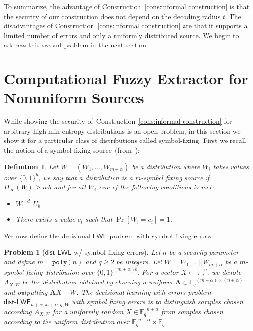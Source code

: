 \documentclass[11pt]{article}
\newcommand{\consref}[1]{\mbox{Construction~\ref{#1}}}
\newcommand{\class}[1]{{\ensuremath{\mathsf{#1}}}}
\newcommand{\vect}[1]{\ensuremath{\textbf{#1}}}
\newcommand{\Fq}{\ensuremath{\mathbb{F}_q}}
\newcommand{\poly}{\ensuremath{\mathtt{poly}}\xspace}
\newcommand{\LWE}{\class{LWE}}
\newcommand{\distLWE}{\ensuremath{\class{dist\mbox{-}LWE}}}
\newtheorem{definition}[theorem]{Definition}
\newtheorem{assumption}[theorem]{Assumption}
\newtheorem{problem}[theorem]{Problem}
\newcommand{\vA}{\vect{A}}
\newcommand{\ignore}[1]{}
\begin{document}
To summarize, the advantage of \consref{cons:informal construction} is that the security of our construction does not depend on the decoding radius $t$.  
The disadvantages of \consref{cons:informal construction} are that it supports a limited number of errors and only a uniformly distributed source.  We begin to address this second problem in the next section.

\section{Computational Fuzzy Extractor for Nonuniform Sources}
\label{sec:LWE block fixing sources}
While showing the security of~\consref{cons:informal construction} for arbitrary high-min-entropy distributions is an open problem, in this section we show it for a particular class of distributions called symbol-fixing.  First we recall the notion of a symbol fixing source~(from~\cite{KZ07}): 
\begin{definition}
Let $W = (W_1,..., W_{m+\alpha})$ be a distribution where $W_i$ takes values over $\{0,1\}^b$, we say that a distribution is a $m$-\emph{symbol fixing source} if $H_\infty(W)\geq mb$ and for all $W_i$ one of the following conditions is met:
\begin{itemize}
\item $W_i \overset{d}= U_b$
\item There exists a value $c_i$ such that $\Pr[W_i = c_i] =1$.
\end{itemize}
\end{definition}

\ignore{
We now study \consref{cons:informal construction} with a symbol fixing source.  

\begin{assumption}[LWE w/ entropic errors]
Let $n$ be a security parameter and define $m = \poly(n)$ and $q\geq 2$ be integers.  Let $W = W_1||...||W_{m+\alpha}$ be a $m$-block fixing distribution over $\{0,1\}^{(m+\alpha)\ell}$. For a vector 
Let $A\in\Fq^{(m+\alpha)\times (n+\alpha)}$ and let $x\in\Fq^{n+\alpha}$.  No PPT algorithm given $Ax+W$ can recover $x$ with probability greater than nonnegligible.
\end{assumption}
}
We now define the decisional $\LWE$ problem with symbol fixing errors: 
\begin{problem}[$\distLWE$ w/ symbol fixing errors]
Let $n$ be a security parameter and define $m = \poly(n)$ and $q\geq 2$ be integers.  Let $W = W_1||...||W_{m+\alpha}$ be a $m$-symbol fixing distribution over $\{0,1\}^{(m+\alpha)b}$. For a vector $X \leftarrow \Fq^n$, we denote $A_{X, W}$ be the distribution obtained by choosing a uniform $\vA\in\Fq^{(m+\alpha)\times (n+\alpha)}$ and outputting $\vA X + W$. The decisional learning with errors problem $\distLWE_{n+\alpha, m+\alpha, q, W}$ with symbol fixing errors is to distinguish samples chosen according $A_{X, W}$ for a uniformly random $X \in \Fq^{n+\alpha}$ from samples chosen according to the uniform distribution over $\Fq^{n+\alpha} \times \Fq$.
\end{problem}
\end{document}

